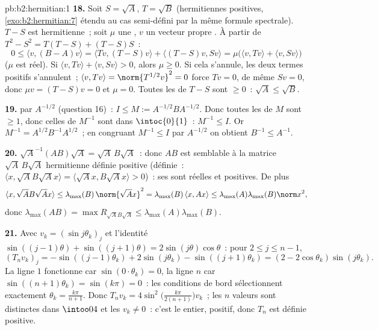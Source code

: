 \begin{solution}{pb:b2:hermitian:1}
\textbf{18.} Soit $S = \sqrt A$, $T = \sqrt B$ (hermitiennes
positives, \cref{exo:b2:hermitian:7} étendu au cas
semi-défini par la même formule spectrale). $T - S$ est
hermitienne~; soit $\mu$ une , $v$ un vecteur propre .
À partir de $T^2 - S^2 = T(T - S) + (T - S)S$~:
\[
0 \leq \langle v, (B - A)v\rangle
= \langle Tv, (T-S)v\rangle + \langle (T-S)v, Sv\rangle
= \mu\bigl(\langle v, Tv\rangle + \langle v,
Sv\rangle\bigr)
\]
($\mu$ est réel). Si $\langle v, Tv\rangle + \langle v,
Sv\rangle > 0$, alors $\mu \geq 0$. Si cela s'annule, les deux
termes positifs s'annulent~; $\langle v, Tv\rangle =
\norm{T^{1/2}v}^2 = 0$ force $Tv = 0$, de même $Sv = 0$, donc
$\mu v = (T - S)v = 0$ et $\mu = 0$. Toutes les  de $T -
S$ sont $\geq 0$~: $\sqrt A \leq \sqrt B$.

\textbf{19.}  par $A^{-1/2}$ (question 16)~: $I \leq M
:= A^{-1/2}BA^{-1/2}$. Donc toutes les  de $M$ sont $\geq 1$,
donc celles de $M^{-1}$ sont dans $\intoc{0}{1}$~: $M^{-1} \leq I$.
Or $M^{-1} = A^{1/2}B^{-1}A^{1/2}$~; en congruant $M^{-1} \leq
I$ par $A^{-1/2}$ on obtient $B^{-1} \leq A^{-1}$.

\textbf{20.} $\sqrt A^{-1}(AB)\sqrt A = \sqrt A\,B\sqrt A$~: donc
$AB$ est semblable à la matrice $\sqrt A\,B\sqrt A$ hermitienne
définie positive (définie~: $\langle x, \sqrt AB\sqrt Ax\rangle =
\langle \sqrt Ax, B\sqrt Ax\rangle > 0$)~: ses  sont
réelles et positives. De plus
\[
\langle x, \sqrt AB\sqrt Ax\rangle
\leq \lambda_{\max}(B)\,\norm{\sqrt Ax}^2
= \lambda_{\max}(B)\,\langle x, Ax\rangle
\leq \lambda_{\max}(A)\lambda_{\max}(B)\norm x^2 ,
\]
donc $\lambda_{\max}(AB) = \max R_{\sqrt AB\sqrt A} \leq
\lambda_{\max}(A)\lambda_{\max}(B)$.

\textbf{21.} Avec $v_k = (\sin j\theta_k)_j$ et l'identité
$\sin((j-1)\theta) + \sin((j+1)\theta) =
2\sin(j\theta)\cos\theta$~: pour $2 \leq j \leq n-1$,
\[
(T_nv_k)_j = -\sin((j{-}1)\theta_k) + 2\sin(j\theta_k) -
\sin((j{+}1)\theta_k)
= (2 - 2\cos\theta_k)\sin(j\theta_k) .
\]
La ligne $1$ fonctionne car $\sin(0\cdot\theta_k) = 0$, la ligne $n$
car $\sin((n+1)\theta_k) = \sin(k\pi) = 0$~: les conditions de bord
sélectionnent exactement $\theta_k = \frac{k\pi}{n+1}$. Donc
$T_nv_k = 4\sin^2\bigl(\frac{k\pi}{2(n+1)}\bigr)v_k$~; les $n$
valeurs sont distinctes dans $\intoo04$ et les $v_k \neq 0$~: c'est
le  entier, positif, donc $T_n$ est définie positive.


\end{solution}
